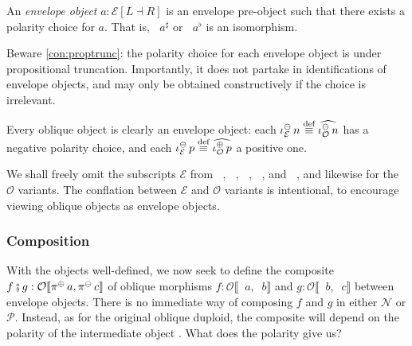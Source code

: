 \documentclass[runningheads]{llncs}
\newcommand*\rocqlogo{\usebox{\rocqlogobox}}
\newcommand{\lemmaref}[3]{\href{https://github.com/UniMath/UniMath/blob/94fae0eda57a778cec704bfa73b4ff525c9bc475/#1\#L#2?name=#3}{\rocqlogo}}
\newcommand{\acat}[1]{\mathcal{#1}}
\newcommand{\PP}{\acat{P}}
\newcommand{\NN}{\acat{N}}
\newcommand{\OO}{\acat{O}}
\newcommand{\EE}{\acat{E}}
\newcommand{\Env}[1]{\EE[#1]}
\newcommand{\dcomp}{\fatsemi}
\newcommand{\morsof}[3]{{#1}\llbracket{#2},{#3}\rrbracket}
\newcommand{\defequiv}{\overset{\mathrm{\textup{def}}}{\equiv}}
\newcommand{\projneg}{\mathop{\pi^{\ominus}}}
\newcommand{\projpos}{\mathop{\pi^{\oplus}}}
\newcommand{\innegE}{\mathop{\iota^{\ominus}_{\EE}}}
\newcommand{\inposE}{\mathop{\iota^{\oplus}_{\EE}}}
\newcommand{\projnegE}{\mathop{\pi^{\ominus}_{\EE}}}
\newcommand{\projposE}{\mathop{\pi^{\oplus}_{\EE}}}
\newcommand{\crossmorE}{\mathop{\mathsf{cross}_{\EE}}}
\newcommand{\innegO}{\mathop{\iota^{\ominus}_{\OO}}}
\newcommand{\inposO}{\mathop{\iota^{\oplus}_{\OO}}}
\begin{document}
\begin{definition}[{\lemmaref{UniMath/CategoryTheory/Nonassociative/Duploids/FromAdjunction/Envelope.v}{329}{envelope\_ob}}]
\label{def:envelope-ob}
An \emph{envelope object} \(a : \Env{L \dashv R}\) is an envelope
pre\hyp{}object such that there exists a polarity choice for
\(a\). That is, \(\crossmorE{a}^\sharp\) or \(\crossmorE{a}^\flat\) is
an isomorphism.
\end{definition}
\begin{remark}
\label{rem:envelope-ob}
Beware \autoref{con:proptrunc}: the polarity choice for each envelope object
is under propositional truncation. Importantly, it does not partake in
identifications of envelope objects, and may only be obtained
constructively if the choice is irrelevant.
\end{remark}

\begin{exampledef}
Every oblique object is clearly an envelope object: each \(\innegE{n}
\defequiv \widehat{\innegO{n}}\) has a negative polarity choice,
and each \(\innegE{p} \defequiv \widehat{\inposO{p}}\) a positive one.
\end{exampledef}
\begin{notation}
We shall freely omit the subscripts \(\EE\) from \(\inposE\),
\(\innegE\), \(\projposE\), \(\projnegE\), and \(\crossmorE\), and
likewise for the \(\OO\) variants. The conflation between \(\EE\) and
\(\OO\) variants is intentional, to encourage viewing oblique objects
as envelope objects.
\end{notation}
\subsubsection*{Composition}
\label{sec:composition}
With the objects well\hyp{}defined, we now seek to define the composite \(f
\dcomp g : \morsof\OO{\projpos a}{\projneg c}\) of oblique morphisms
\(f : \morsof\OO{\projpos a}{\projneg b}\) and \(g :
\morsof\OO{\projpos b}{\projneg c}\) between envelope objects. There
is no immediate way of composing \(f\) and \(g\) in either \(\NN\) or
\(\PP\). Instead, as for the original oblique duploid, the composite
will depend on the polarity of the intermediate object
\cite{MunchMaccagnoni14}. What does the polarity give us?
\end{document}
